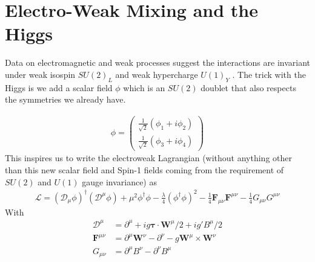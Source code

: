 \section{Electro-Weak Mixing and the Higgs}
Data on electromagnetic and weak processes suggest the interactions are invariant under weak isospin $SU(2)_L$ and weak hypercharge $U(1)_Y$ \cite{halzen}. The trick with the Higgs is we add a scalar field $\phi$ which is an $SU(2)$ doublet that also respects the symmetries we already have.

\begin{align}
\phi = \begin{pmatrix}
\frac{1}{\sqrt{2}}(\phi_1+i\phi_2)\\
\frac{1}{\sqrt{2}}(\phi_3 +i\phi_4)
\end{pmatrix}
\end{align}
This inspires us to write the electroweak Lagrangian (without anything other than this new scalar field and Spin-1 fields coming from the requirement of $SU(2)$ and $U(1)$ gauge invariance) as
\begin{align}
\mathcal{L} = (\mathcal{D}_\mu\phi)^\dagger(\mathcal{D}^\mu\phi) + \mu^2\phi^\dagger\phi- \frac{\lambda}{4}(\phi^\dagger\phi)^2 -\frac{1}{4}\textbf{F}_{\mu\nu}\textbf{F}^{\mu\nu} - \frac{1}{4}G_{\mu\nu}G^{\mu\nu}
\end{align}
With 
\begin{align}
\mathcal{D}^\mu &= \partial^\mu + ig\boldsymbol{\tau}\cdot\textbf{W}^\mu/2 + ig'B^\mu/2\\
\textbf{F}^{\mu\nu} &= \partial^\mu\textbf{W}^\nu - \partial^\nu - g\textbf{W}^\mu\times\textbf{W}^\nu\\
G_{\mu\nu} &= \partial^\mu B^\nu - \partial^\nu B^\mu
\end{align}

